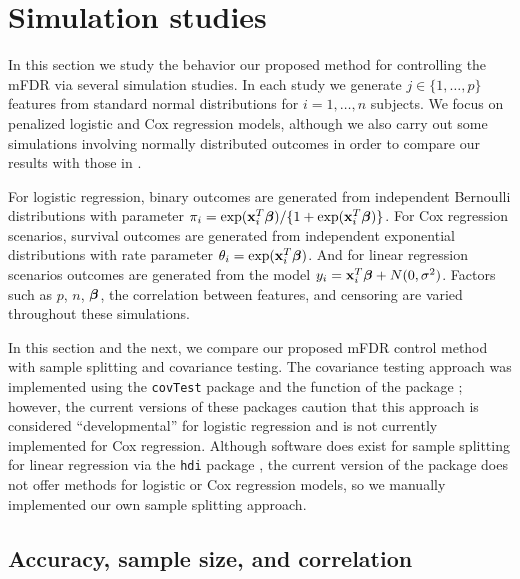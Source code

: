 \section{Simulation studies}
\label{Sec:sim}

In this section we study the behavior our proposed method for controlling the mFDR via several simulation studies. In each study we generate $j \in \{1, \ldots, p\}$ features from standard normal distributions for $i = 1, \ldots, n$ subjects. We focus on penalized logistic and Cox regression models, although we also carry out some simulations involving normally distributed outcomes in order to compare our results with those in \citet{BrehenyMFDR}.

For logistic regression, binary outcomes are generated from independent Bernoulli distributions with parameter $\pi_i = \exp(\mathbf{x}_i^T \boldsymbol{\beta})/\{1 + \exp(\mathbf{x}_i^T \boldsymbol{\beta})\}$. For Cox regression scenarios, survival outcomes are generated from independent exponential distributions with rate parameter $\theta_i = \exp(\mathbf{x}_i^T \boldsymbol{\beta})$. And for linear regression scenarios outcomes are generated from the model $y_i = \mathbf{x}_i^T\boldsymbol{\beta} + N(0,\sigma^2)$. Factors such as $p$, $n$, $\boldsymbol{\beta}$, the correlation between features, and censoring are varied throughout these simulations.

In this section and the next, we compare our proposed mFDR control method with sample splitting and covariance testing.  The covariance testing approach was implemented using the {\tt covTest} package \citep{CovTest} and the  function of the  package \citep{Selective_Inference}; however, the current versions of these packages caution that this approach is considered ``developmental'' for logistic regression and is not currently implemented for Cox regression.  Although software does exist for sample splitting for linear regression via the {\tt hdi} package \cite{Dezeure2015}, the current version of the package does not offer methods for logistic or Cox regression models, so we manually implemented our own sample splitting approach.

\subsection{Accuracy, sample size, and correlation}
\label{Sec:accuracy}

